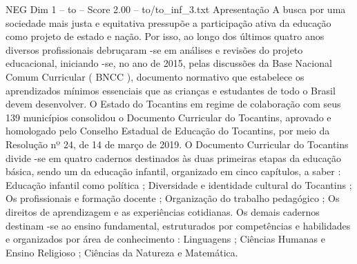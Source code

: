 \begin{textsample}{NEG Dim 1 – to – Score 2.00 – to/to\_inf\_3.txt}  \label{ex:f1_neg_037}
Apresentação A busca por uma sociedade mais justa e equitativa pressupõe a participação ativa da educação como projeto de estado e nação.
Por isso, ao longo dos últimos quatro anos diversos profissionais debruçaram -se em análises e revisões do projeto educacional, iniciando -se, no ano de 2015, pelas discussões da Base Nacional Comum Curricular ( BNCC ), documento normativo que estabelece os aprendizados mínimos essenciais que as crianças e estudantes de todo o Brasil devem desenvolver.
O Estado do Tocantins em regime de colaboração com seus 139 municípios consolidou o Documento Curricular do Tocantins, aprovado e homologado pelo Conselho Estadual de Educação do Tocantins, por meio da Resolução nº 24, de 14 de março de 2019.
O Documento Curricular do Tocantins divide -se em quatro cadernos destinados às duas primeiras etapas da educação básica, sendo um da educação infantil, organizado em cinco capítulos, a saber : Educação infantil como política ; Diversidade e identidade cultural do Tocantins ; Os profissionais e formação docente ; Organização do trabalho pedagógico ; Os direitos de aprendizagem e as experiências cotidianas.
Os demais cadernos destinam -se ao ensino fundamental, estruturados por competências e habilidades e organizados por área de conhecimento : Linguagens ; Ciências Humanas e Ensino Religioso ; Ciências da Natureza e Matemática.

\end{textsample}
